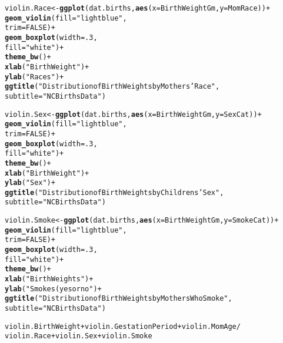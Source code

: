 \documentclass{article}\usepackage[]{graphicx}\usepackage[]{xcolor}
\makeatletter
\newcommand{\hlnum}[1]{\textcolor[rgb]{0.686,0.059,0.569}{#1}}%
\newcommand{\hlstr}[1]{\textcolor[rgb]{0.192,0.494,0.8}{#1}}%
\newcommand{\hlopt}[1]{\textcolor[rgb]{0,0,0}{#1}}%
\newcommand{\hlstd}[1]{\textcolor[rgb]{0.345,0.345,0.345}{#1}}%
\newcommand{\hlkwb}[1]{\textcolor[rgb]{0.69,0.353,0.396}{#1}}%
\newcommand{\hlkwc}[1]{\textcolor[rgb]{0.333,0.667,0.333}{#1}}%
\newcommand{\hlkwd}[1]{\textcolor[rgb]{0.737,0.353,0.396}{\textbf{#1}}}%
\newenvironment{kframe}{%
 \def\at@end@of@kframe{}%
 \ifinner\ifhmode%
  \def\at@end@of@kframe{\end{minipage}}%
  \begin{minipage}{\columnwidth}%
 \fi\fi%
 \def\FrameCommand##1{\hskip\@totalleftmargin \hskip-\fboxsep
 \colorbox{shadecolor}{##1}\hskip-\fboxsep
     \hskip-\linewidth \hskip-\@totalleftmargin \hskip\columnwidth}%
 \MakeFramed {\advance\hsize-\width
   \@totalleftmargin\z@ \linewidth\hsize
   \@setminipage}}%
 {\par\unskip\endMakeFramed%
 \at@end@of@kframe}
\newenvironment{knitrout}{}{} %
\makeatother
\begin{document}
\begin{enumerate}[a.]
\begin{knitrout}
\begin{kframe}
\begin{alltt}
\hlstd{violin.Race} \hlkwb{<-} \hlkwd{ggplot}\hlstd{(dat.births,} \hlkwd{aes}\hlstd{(}\hlkwc{x}\hlstd{=BirthWeightGm,} \hlkwc{y}\hlstd{=MomRace))}\hlopt{+}
  \hlkwd{geom_violin}\hlstd{(}\hlkwc{fill} \hlstd{=} \hlstr{"lightblue"}\hlstd{,}
              \hlkwc{trim} \hlstd{=} \hlnum{FALSE}\hlstd{)}\hlopt{+}
  \hlkwd{geom_boxplot}\hlstd{(}\hlkwc{width} \hlstd{=} \hlnum{.3}\hlstd{,}
               \hlkwc{fill} \hlstd{=} \hlstr{"white"}\hlstd{)} \hlopt{+}
  \hlkwd{theme_bw}\hlstd{()}\hlopt{+}
  \hlkwd{xlab}\hlstd{(}\hlstr{"Birth Weight"}\hlstd{)}\hlopt{+}
  \hlkwd{ylab}\hlstd{(}\hlstr{"Races"}\hlstd{)}\hlopt{+}
  \hlkwd{ggtitle}\hlstd{(}\hlstr{"Distribution of Birth Weights by Mothers' Race"}\hlstd{,}
          \hlkwc{subtitle} \hlstd{=} \hlstr{"NCBirths Data"}\hlstd{)}

\hlstd{violin.Sex} \hlkwb{<-} \hlkwd{ggplot}\hlstd{(dat.births,} \hlkwd{aes}\hlstd{(}\hlkwc{x}\hlstd{=BirthWeightGm,} \hlkwc{y}\hlstd{=SexCat))}\hlopt{+}
  \hlkwd{geom_violin}\hlstd{(}\hlkwc{fill} \hlstd{=} \hlstr{"lightblue"}\hlstd{,}
              \hlkwc{trim} \hlstd{=} \hlnum{FALSE}\hlstd{)}\hlopt{+}
  \hlkwd{geom_boxplot}\hlstd{(}\hlkwc{width} \hlstd{=} \hlnum{.3}\hlstd{,}
               \hlkwc{fill} \hlstd{=} \hlstr{"white"}\hlstd{)} \hlopt{+}
  \hlkwd{theme_bw}\hlstd{()}\hlopt{+}
  \hlkwd{xlab}\hlstd{(}\hlstr{"Birth Weight"}\hlstd{)}\hlopt{+}
  \hlkwd{ylab}\hlstd{(}\hlstr{"Sex"}\hlstd{)}\hlopt{+}
  \hlkwd{ggtitle}\hlstd{(}\hlstr{"Distribution of Birth Weights by Childrens' Sex"}\hlstd{,}
          \hlkwc{subtitle} \hlstd{=} \hlstr{"NCBirths Data"}\hlstd{)}


\hlstd{violin.Smoke} \hlkwb{<-} \hlkwd{ggplot}\hlstd{(dat.births,} \hlkwd{aes}\hlstd{(}\hlkwc{x}\hlstd{=BirthWeightGm,} \hlkwc{y}\hlstd{=SmokeCat))}\hlopt{+}
  \hlkwd{geom_violin}\hlstd{(}\hlkwc{fill} \hlstd{=} \hlstr{"lightblue"}\hlstd{,}
              \hlkwc{trim} \hlstd{=} \hlnum{FALSE}\hlstd{)}\hlopt{+}
  \hlkwd{geom_boxplot}\hlstd{(}\hlkwc{width} \hlstd{=} \hlnum{.3}\hlstd{,}
               \hlkwc{fill} \hlstd{=} \hlstr{"white"}\hlstd{)} \hlopt{+}
  \hlkwd{theme_bw}\hlstd{()}\hlopt{+}
  \hlkwd{xlab}\hlstd{(}\hlstr{"Birth Weights"}\hlstd{)}\hlopt{+}
  \hlkwd{ylab}\hlstd{(}\hlstr{"Smokes (yes or no"}\hlstd{)}\hlopt{+}
  \hlkwd{ggtitle}\hlstd{(}\hlstr{"Distribution of Birth Weights by Mothers Who Smoke"}\hlstd{,}
          \hlkwc{subtitle} \hlstd{=} \hlstr{"NCBirths Data"}\hlstd{)}

\hlstd{violin.BirthWeight} \hlopt{+} \hlstd{violin.GestationPeriod} \hlopt{+} \hlstd{violin.MomAge} \hlopt{/}
  \hlstd{violin.Race} \hlopt{+} \hlstd{violin.Sex} \hlopt{+} \hlstd{violin.Smoke}
\end{alltt}
\end{kframe}
\end{knitrout}


\end{enumerate}
\end{document}
